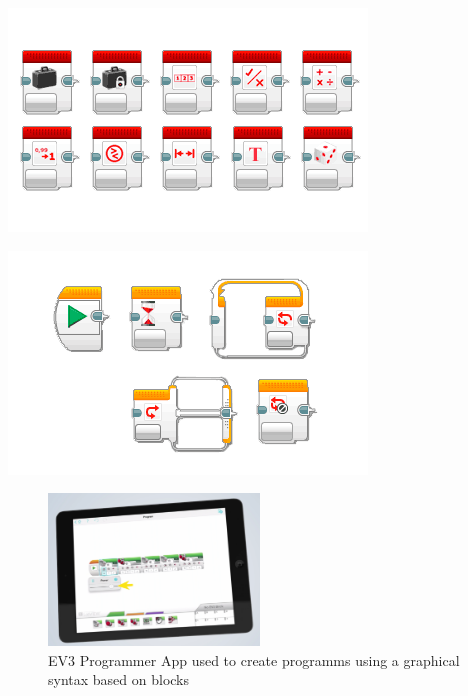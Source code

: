 \documentclass[runningheads,a4paper]{llncs}
\begin{document}
  \begin{minipage}{.5\textwidth} %
	  \centering
    \includegraphics[width=\textwidth]{images/LearnToProgram_operations_blocks_landscape.png}
  \end{minipage}
  \begin{minipage}{.5\textwidth} %
	  \centering
    \includegraphics[width=\textwidth]{images/LearnToProgram_flow_blocks_landscape.png}
  \end{minipage}
  
  
    \begin{figure}[ht]
	  \centering
    \includegraphics[width=0.5\textwidth]{images/mindstorms0.PNG}
	  \caption{EV3 Programmer App used to create programms using a graphical syntax based on blocks }
    \end{figure}
\end{document}
